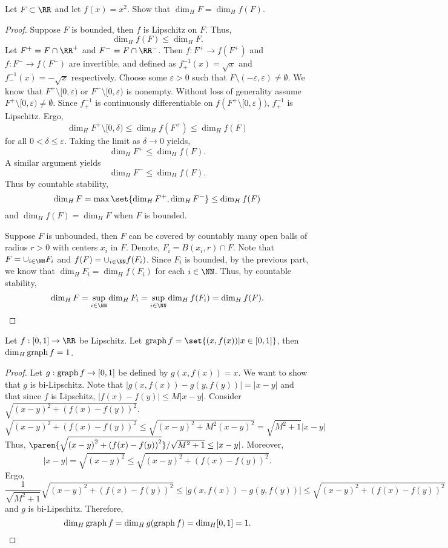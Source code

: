 \begin{example}
	Let $F\subset\RR$ and let $f(x)=x^2$.
	Show that $\dim_H F = \dim_H f(F)$.
\end{example}

\begin{proof}
	Suppose $F$ is bounded, then $f$ is Lipschitz on $F$.
	Thus,
	\[
		\dim_H f(F) \leq \dim_H F.
	\]
	Let $F^+=F\cap\RR^+$ and $F^-=F\cap\RR^-$.
	Then $f:F^+\rightarrow f(F^+)$ and $f:F^-\rightarrow f(F^-)$ are invertible, and defined as $f^{-1}_+(x)=\sqrt{x}$ and $f^{-1}_-(x)=-\sqrt{x}$ respectively.
	Choose some $\varepsilon>0$ such that $F\setminus(-\varepsilon,\varepsilon)\neq\emptyset$.
	We know that $F^+\setminus[0,\varepsilon)$ or $F^-\setminus[0,\varepsilon)$ is nonempty. %
	Without loss of generality assume $F^+\setminus[0,\varepsilon)\neq\emptyset$. %
	Since $f^{-1}_+$ is continuously differentiable on $f(F^+\setminus[0,\varepsilon))$, $f^{-1}_+$ is Lipschitz. %
	Ergo,
	\[
		\dim_H F^+\setminus[0,\delta) \leq \dim_H f(F^+)\leq \dim_H f(F) %
	\]
	for all $0 < \delta \leq \varepsilon$.
	Taking the limit as $\delta\rightarrow 0$ yields,
	\[
		\dim_H F^+ \leq \dim_H f(F).
	\]
	A similar argument yields
	\[
		\dim_H F^- \leq \dim_H f(F).
	\]
	Thus by countable stability,
	\[
		\dim_H F = \max \set{\dim_H F^+, \dim_H F^-}\leq \dim_H f(F)
	\]
	and $\dim_H f(F)=\dim_H F$ when $F$ is bounded.

	Suppose $F$ is unbounded, then $F$ can be covered by countably many open balls of radius $r>0$ with centers $x_i$ in $F$.
	Denote, $F_i=B(x_i,r)\cap F$.
	Note that $F=\cup_{i\in\NN} F_i$ and $f(F)=\cup_{i\in\NN} f(F_i)$.
	Since $F_i$ is bounded, by the previous part, we know that $\dim_H F_i = \dim_H f(F_i)$ for each $i\in\NN$.
	Thus, by countable stability,
	\[
		\dim_H F = \sup\limits_{i\in\NN} \dim_H F_i = \sup\limits_{i\in\NN} \dim_H f(F_i)=\dim_H f(F).
	\]
\end{proof}

\begin{example}
	Let $f:[0,1]\rightarrow\RR$ be Lipschitz.
	Let $\gra f=\set{(x,f(x))|x\in[0,1]}$, then $\operatorname{dim}_H \operatorname{graph} f =1$.
\end{example}
\begin{proof}
	Let $g:\operatorname{graph} f\rightarrow [0,1]$ be defined by $g(x,f(x))=x$.
	We want to show that $g$ is bi-Lipschitz.
	Note that $|g(x,f(x))-g(y,f(y))|=|x-y|$ and that since $f$ is Lipschitz, $|f(x)-f(y)|\leq M|x-y|$.
	Consider $\sqrt{{(x-y)}^2+{(f(x)-f(y))}^2}$.
	\[
		\sqrt{{(x-y)}^2+{(f(x)-f(y))}^2}
		\leq \sqrt{{(x-y)}^2+M^2{(x-y)}^2}
		=\sqrt{M^2+1}|x-y|
	\]
	Thus, $\paren{\sqrt{{(x-y)}^2+{(f(x)-f(y))}^2}}/\sqrt{M^2+1}\leq|x-y|$.
	Moreover,
	\[
		|x-y|=\sqrt{{(x-y)}^2}\leq\sqrt{{(x-y)}^2+{(f(x)-f(y))}^2}.
	\]
	Ergo,
	\[
		\frac{1}{\sqrt{M^2+1}}\sqrt{{(x-y)}^2+{(f(x)-f(y))}^2}
		\leq |g(x,f(x))-g(y,f(y))|
		\leq \sqrt{{(x-y)}^2+{(f(x)-f(y))}^2}
	\]
	and $g$ is bi-Lipschitz.
	Therefore,
	\[
		\operatorname{dim}_H \operatorname{graph} f = \operatorname{dim}_H g(\operatorname{graph} f) = \operatorname{dim}_H [0,1] = 1.
	\]
\end{proof}

